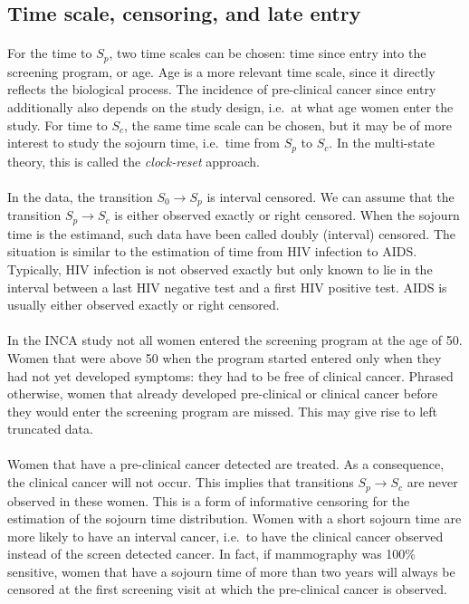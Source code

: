 \subsection{Time scale, censoring, and late entry}
\paragraph{}For the time to $S_p$, two time scales can be chosen: time since entry into the screening program, or age. Age is a more relevant time scale, since it directly reflects the biological process. The incidence of pre-clinical cancer since entry additionally also depends on the study design, i.e.\ at what age women enter the study. For time to $S_c$, the same time scale can be chosen, but it may be of more interest to study the sojourn time, i.e.\ time from $S_p$ to $S_c$. In the multi-state theory, this is called the \textit{clock-reset} approach.

\paragraph{}In the data, the transition $S_0 \rightarrow S_p$ is interval censored. We can assume that the transition $S_p \rightarrow S_c$ is either observed exactly or right censored. When the sojourn time is the estimand, such data have been called doubly (interval) censored. The situation is similar to the estimation of time from HIV infection to AIDS. Typically, HIV infection is not observed exactly but only known to lie in the interval between a last HIV negative test and a first HIV positive test. AIDS is usually either observed exactly or right censored.

\paragraph{}In the INCA study not all women entered the screening program at the age of 50. Women that were above 50 when the program started entered only when they had not yet developed symptoms: they had to be free of clinical cancer. Phrased otherwise, women that already developed pre-clinical or clinical cancer before they would enter the screening program are missed. This may give rise to left truncated data.
  
\paragraph{}Women that have a pre-clinical cancer detected are treated. As a consequence, the clinical cancer will not occur. This implies that transitions $S_p \rightarrow S_c$ are never observed in these women. This is a form of informative censoring for the estimation of the sojourn time distribution. Women with a short sojourn time are more likely to have an interval cancer, i.e.\  to have the clinical cancer observed instead of the screen detected cancer. In fact, if mammography was 100\% sensitive, women that have a sojourn time of more than two years will always be censored at the first screening visit at which the pre-clinical cancer is observed. 

